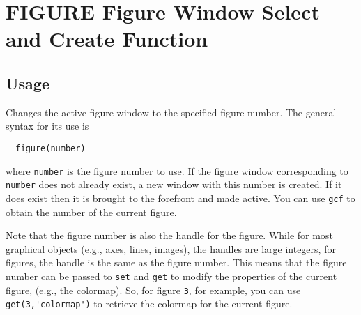 \section{FIGURE Figure Window Select and Create Function}

\subsection{Usage}

Changes the active figure window to the specified figure
number.  The general syntax for its use is 
\begin{verbatim}
  figure(number)
\end{verbatim}
where \verb|number| is the figure number to use. If the figure window 
corresponding to \verb|number| does not already exist, a new 
window with this number is created.  If it does exist
then it is brought to the forefront and made active.
You can use \verb|gcf| to obtain the number of the current figure.

Note that the figure number is also the handle for the figure.
While for most graphical objects (e.g., axes, lines, images), the
handles are large integers, for figures, the handle is the same
as the figure number.  This means that the figure number can be
passed to \verb|set| and \verb|get| to modify the properties of the
current figure, (e.g., the colormap).  So, for figure \verb|3|, for 
example, you can use \verb|get(3,'colormap')| to retrieve the colormap
for the current figure.
